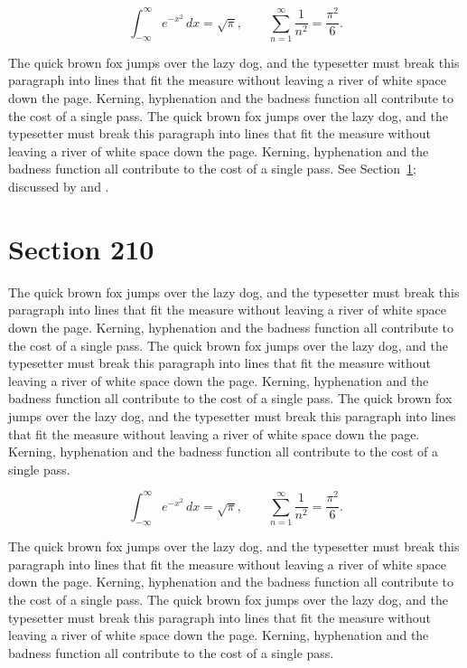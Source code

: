\documentclass{article}
\begin{document}
\begin{equation}\label{eq:209}
\int_{-\infty}^{\infty} e^{-x^{2}}\,dx = \sqrt{\pi}, \qquad
\sum_{n=1}^{\infty} \frac{1}{n^{2}} = \frac{\pi^{2}}{6}.
\end{equation}

The quick brown fox jumps over the lazy dog, and the typesetter must break this paragraph into lines that fit the measure without leaving a river of white space down the page. Kerning, hyphenation and the badness function all contribute to the cost of a single pass. The quick brown fox jumps over the lazy dog, and the typesetter must break this paragraph into lines that fit the measure without leaving a river of white space down the page. Kerning, hyphenation and the badness function all contribute to the cost of a single pass. 
See Section~\ref{sec:210}; discussed by \textcite{k5} and \textcite{l2}.
\section{Section 210}
\label{sec:210}
The quick brown fox jumps over the lazy dog, and the typesetter must break this paragraph into lines that fit the measure without leaving a river of white space down the page. Kerning, hyphenation and the badness function all contribute to the cost of a single pass. The quick brown fox jumps over the lazy dog, and the typesetter must break this paragraph into lines that fit the measure without leaving a river of white space down the page. Kerning, hyphenation and the badness function all contribute to the cost of a single pass. The quick brown fox jumps over the lazy dog, and the typesetter must break this paragraph into lines that fit the measure without leaving a river of white space down the page. Kerning, hyphenation and the badness function all contribute to the cost of a single pass. 

\begin{equation}\label{eq:210}
\int_{-\infty}^{\infty} e^{-x^{2}}\,dx = \sqrt{\pi}, \qquad
\sum_{n=1}^{\infty} \frac{1}{n^{2}} = \frac{\pi^{2}}{6}.
\end{equation}

The quick brown fox jumps over the lazy dog, and the typesetter must break this paragraph into lines that fit the measure without leaving a river of white space down the page. Kerning, hyphenation and the badness function all contribute to the cost of a single pass. The quick brown fox jumps over the lazy dog, and the typesetter must break this paragraph into lines that fit the measure without leaving a river of white space down the page. Kerning, hyphenation and the badness function all contribute to the cost of a single pass. 
\end{document}
